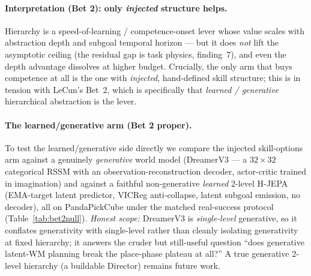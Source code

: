 \documentclass{article}
\begin{document}
\paragraph{Interpretation (Bet 2): only \emph{injected} structure helps.}
Hierarchy is a speed-of-learning / competence-onset lever whose value scales with
abstraction depth and subgoal temporal horizon --- but it does \emph{not} lift the
asymptotic ceiling (the residual gap is task physics, finding~7), and even the
depth advantage dissolves at higher budget. Crucially, the only arm that buys
competence at all is the one with \emph{injected}, hand-defined skill structure;
this is in tension with LeCun's Bet~2, which is specifically that
\emph{learned / generative} hierarchical abstraction is the lever.

\paragraph{The learned/generative arm (Bet 2 proper).}
To test the learned/generative side directly we compare the injected skill-options
arm against a genuinely \emph{generative} world model (DreamerV3 --- a $32\times32$
categorical RSSM with an observation-reconstruction decoder, actor-critic trained
in imagination) and against a faithful non-generative \emph{learned} 2-level
H-JEPA (EMA-target latent predictor, VICReg anti-collapse, latent subgoal emission,
no decoder), all on PandaPickCube under the matched real-success protocol
(Table~\ref{tab:bet2null}). \emph{Honest scope:} DreamerV3 is \emph{single-level}
generative, so it conflates generativity with single-level rather than cleanly
isolating generativity at fixed hierarchy; it answers the cruder but still-useful
question ``does generative latent-WM planning break the place-phase plateau at
all?'' A true generative 2-level hierarchy (a buildable Director) remains future
work.
\end{document}
